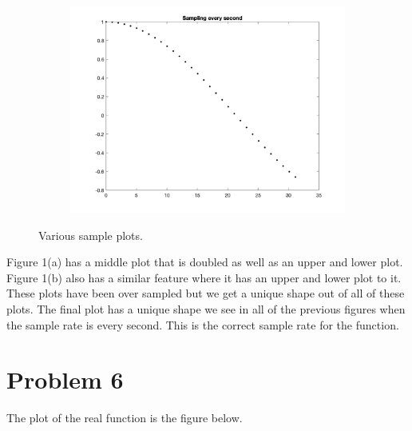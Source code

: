 \documentclass[12pt]{article}
\begin{document}
\begin{figure}[h!]
\begin{subfigure}{0.49\columnwidth}
\centering
\includegraphics[width=\textwidth]{problem_5_3.png}
\caption{}
\label{fig:time3}
\end{subfigure}\hfill

\caption{Various sample plots.}
\label{fig:time}

\end{figure}

Figure 1(a) has a middle plot that is doubled as well as an upper and lower plot. Figure 1(b) also has a similar feature where it has an upper and lower plot to it. These plots have been over sampled but we get a unique shape out of all of these plots. The final plot has a unique shape we see in all of the previous figures when the sample rate is every second. This is the correct sample rate for the function.

\newpage

\section*{Problem 6}

The plot of the real function is the figure below. 
\end{document}
